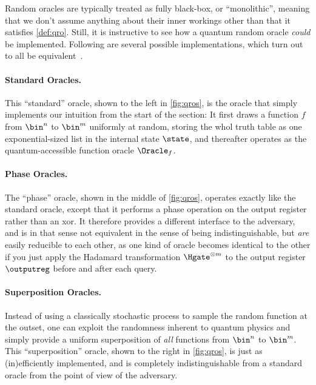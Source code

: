     Random oracles are typically treated as fully black-box, or ``monolithic'',
      meaning that we don't assume anything about their inner workings other
      than that it satisfies \cref{def:qro}. Still, it is
      instructive to see how a quantum random oracle \emph{could} be
      implemented. Following are several possible implementations, which turn
      out to all be equivalent~\cite{C:Zhandry19}.

    \paragraph{Standard Oracles.}
      This ``standard'' oracle, shown to the left in \cref{fig:qros}, is the
        oracle that simply implements our
        intuition from the start of the section: It first 
        draws a function $f$ from $\bin^n$ to $\bin^m$ uniformly at random, storing
        the whol truth table as one exponential-sized list in the internal
        state $\state$, and thereafter operates as the quantum-accessible
        function oracle $\Oracle_f$.

    \paragraph{Phase Oracles.}
      The ``phase'' oracle, shown in the middle of \cref{fig:qros}, operates
        exactly like the standard oracle, except that it
        performs a phase operation on the output register rather than an xor.
        It therefore provides a different interface to the adversary, and
        is in that sense not equivalent in the sense of being
        indistinguishable, but \emph{are} easily reducible to each other, as
        one kind of oracle becomes identical to the other if you just apply the Hadamard
        transformation $\Hgate^{\otimes m}$ to the output register $\outputreg$
        before and after each query.

    \paragraph{Superposition Oracles.}
      Instead of using a classically stochastic process to sample the random
        function at the outset, one can exploit the randomness inherent to
        quantum physics and simply provide a uniform superposition of
        \emph{all} functions from $\bin^n$ to $\bin^m$. This ``superposition''
        oracle, shown to the right in \cref{fig:qros}, is just as
        (in)efficiently implemented, and is completely indistinguishable from a
        standard oracle from the point of view of the adversary. 

